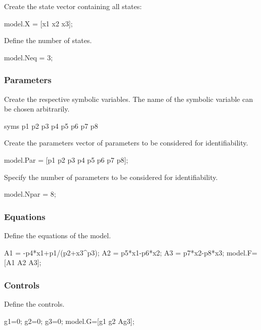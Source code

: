 Create the state vector containing all states\+:


\begin{DoxyCode}
model.X = [x1 x2 x3]; 
\end{DoxyCode}


Define the number of states.


\begin{DoxyCode}
model.Neq = 3; 
\end{DoxyCode}
\hypertarget{def_simu_parameters}{}\subsubsection{Parameters}\label{def_simu_parameters}
Create the respective symbolic variables. The name of the symbolic variable can be chosen arbitrarily.


\begin{DoxyCode}
syms p1 p2 p3 p4 p5 p6 p7 p8 
\end{DoxyCode}


Create the parameters vector of parameters to be considered for identifiability.


\begin{DoxyCode}
model.Par = [p1 p2 p3 p4 p5 p6 p7 p8]; 
\end{DoxyCode}


Specify the number of parameters to be considered for identifiability.


\begin{DoxyCode}
model.Npar = 8; 
\end{DoxyCode}
\hypertarget{def_simu_equtions}{}\subsubsection{Equations}\label{def_simu_equtions}
Define the equations of the model.


\begin{DoxyCode}
A1 = -p4*x1+p1/(p2+x3^p3);
A2 = p5*x1-p6*x2;
A3 = p7*x2-p8*x3;
model.F=[A1 A2 A3];
\end{DoxyCode}
\hypertarget{def_simu_controls}{}\subsubsection{Controls}\label{def_simu_controls}
Define the controls.


\begin{DoxyCode}
g1=0;
g2=0;
g3=0;
model.G=[g1 g2 Ag3];
\end{DoxyCode}



